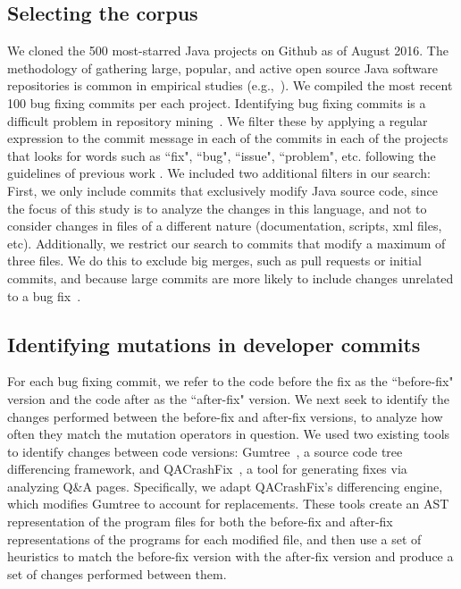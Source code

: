 \documentclass[conference]{IEEEtran}
\begin{document}
\subsection{Selecting the corpus}

We cloned the 500 most-starred Java projects on Github 
as of August 2016. The methodology of 
gathering large,
popular, and active open source Java software repositories is common in
empirical studies (e.g.,~\cite{Ray14}). 
%
We compiled the most recent 100 bug fixing commits per each project. Identifying
bug fixing commits is a difficult
problem in repository mining~\cite{Bird09}. We filter these by applying a
regular expression to the commit message in each of the commits in each of the
projects that looks for words such as ``fix", ``bug", ``issue", ``problem",
etc. following the guidelines of previous work \cite{schroter06,Cubranic05,Fischer03}. 
%
We included two additional filters in our search: First, we only include commits
that exclusively 
modify Java source code, since the focus of this study is to analyze the changes in this language, and not to consider changes in files of a different nature (documentation, scripts, xml files, etc).  Additionally, we restrict our search to commits 
that modify a maximum of three files. We do this to exclude
big merges, such as pull requests or initial commits, and because
large commits are more likely to include changes unrelated to a bug fix~\cite{Dias15,Herzig13,Matsuda15,Kawrykow11}.

\subsection{Identifying mutations in developer commits}
\label{sec:mining}

For each bug fixing commit, we refer to the code before the fix as the
``before-fix" version and the code after as the ``after-fix" version.
We next seek to identify the changes performed between the before-fix and
after-fix versions, to analyze how often they match the mutation operators in
question. 
%
We used two existing tools to identify changes 
between code versions: Gumtree~\cite{falleri14}, a source code tree
differencing framework, and QACrashFix~\cite{gao15}, a tool for generating
fixes via analyzing Q\&A pages.  Specifically, we adapt QACrashFix's
differencing engine, which modifies Gumtree to account for replacements.
These tools create an AST representation of the program files for both the 
before-fix and after-fix representations of the programs for each modified file,
and then use a set of heuristics to match the before-fix version 
with the after-fix version and produce a set of 
changes performed between them. 
\end{document}

